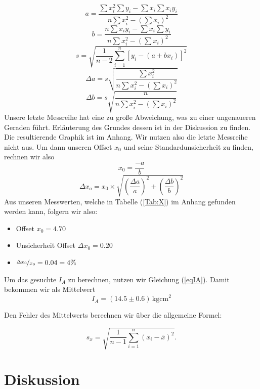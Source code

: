 \documentclass[11pt,a4paper]{article}
\begin{document}
\begin{equation}
a=\frac{\sum x_i^2\sum y_i-\sum x_i\sum x_iy_i}{n\sum x_i^2-(\sum x_i)^2}
\end{equation}
\begin{equation}
b=\frac{n\sum x_iy_i-\sum x_i\sum y_i}{n\sum x_i^2-(\sum x_i)^2}
\end{equation}
\begin{equation}
s=\sqrt{\frac{1}{n-2}\sum^n_{i=1}[y_i-(a+bx_i)]^2}
\end{equation}
\begin{equation}
\Delta a=s\sqrt{\frac{\sum x_i^2}{n\sum x_i^2-(\sum x_i)^2}}
\end{equation}
\begin{equation}
\Delta b=s\sqrt{\frac{n}{n\sum x_i^2-(\sum x_i)^2}}
\end{equation}
Unsere letzte Messreihe hat eine zu gro\ss e Abweichung, was zu einer ungenaueren Geraden f\"uhrt. Erl\"auterung des Grundes dessen ist in der Diskussion zu finden. Die resultierende Graphik ist im Anhang. Wir nutzen also die letzte Messreihe nicht aus.
Um dann unseren Offset $x_0$ und seine Standardunsicherheit zu finden, rechnen wir also
\[
x_0=\frac{-a}{b}
\]
\[
\Delta x_o=x_0\times\sqrt{\left(\frac{\Delta a}{a}\right)^2+\left(\frac{\Delta b}{b}\right)^2}
\]
Aus unseren Messwerten, welche in Tabelle (\ref{Tab:X}) im Anhang gefunden werden kann, folgern wir also:
\begin{itemize}
\item Offset $x_0=4.70$
\item Unsicherheit Offset $\Delta x_0=0.20$
\item $\nicefrac{\Delta x_0}{x_0}=0.04=4\%$
\end{itemize}

Um das gesuchte $I_A$ zu berechnen, nutzen wir Gleichung (\ref{eqIA}). Damit bekommen wir als Mittelwert
\[
I_A=(14.5\pm0.6)\,\mathrm{kgcm}^2
\]

Den Fehler des Mittelwerts berechnen wir \"uber die allgemeine Formel:

\begin{equation}
s_x=\sqrt{\frac{1}{n-1}\sum_{i=1}^n(x_i-\overline{x})^2}.\label{uncertainty1}
\end{equation}

\section{Diskussion}

\end{document}
